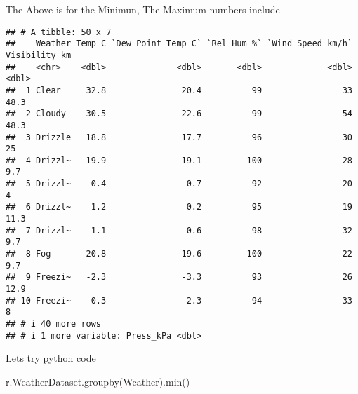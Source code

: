 \documentclass[
]{article}
\newenvironment{Shaded}{\begin{snugshade}}{\end{snugshade}}
\newcommand{\BuiltInTok}[1]{#1}
\newcommand{\NormalTok}[1]{#1}
\newcommand{\StringTok}[1]{\textcolor[rgb]{0.31,0.60,0.02}{#1}}
\begin{document}
The Above is for the Minimun, The Maximum numbers include

\begin{verbatim}
## # A tibble: 50 x 7
##    Weather Temp_C `Dew Point Temp_C` `Rel Hum_%` `Wind Speed_km/h` Visibility_km
##    <chr>    <dbl>              <dbl>       <dbl>             <dbl>         <dbl>
##  1 Clear     32.8               20.4          99                33          48.3
##  2 Cloudy    30.5               22.6          99                54          48.3
##  3 Drizzle   18.8               17.7          96                30          25  
##  4 Drizzl~   19.9               19.1         100                28           9.7
##  5 Drizzl~    0.4               -0.7          92                20           4  
##  6 Drizzl~    1.2                0.2          95                19          11.3
##  7 Drizzl~    1.1                0.6          98                32           9.7
##  8 Fog       20.8               19.6         100                22           9.7
##  9 Freezi~   -2.3               -3.3          93                26          12.9
## 10 Freezi~   -0.3               -2.3          94                33           8  
## # i 40 more rows
## # i 1 more variable: Press_kPa <dbl>
\end{verbatim}

Lets try python code

\begin{Shaded}
\begin{Highlighting}[]
\NormalTok{r.WeatherDataset.groupby(}\StringTok{\textquotesingle{}Weather\textquotesingle{}}\NormalTok{).}\BuiltInTok{min}\NormalTok{()}
\end{Highlighting}
\end{Shaded}
\end{document}

